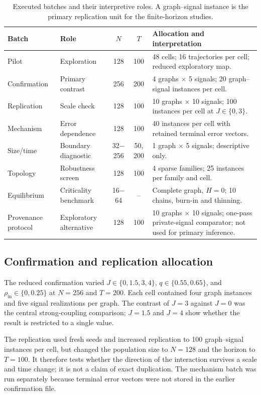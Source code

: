 \documentclass[11pt,a4paper]{article}
\begin{document}
\begin{table}[htbp]
\centering
\caption{Executed batches and their interpretive roles. A graph--signal instance is the primary replication unit for the finite-horizon studies.}
\label{tab:design}
\small
\begin{tabularx}{\textwidth}{@{}l l c c X@{}}
\toprule
Batch & Role & $N$ & $T$ & Allocation and interpretation \\
\midrule
Pilot & Exploration & 128 & 100 & 48 cells; 16 trajectories per cell; reduced exploratory map. \\
Confirmation & Primary contrast & 256 & 200 & 4 graphs $\times$ 5 signals; 20 graph--signal instances per cell. \\
Replication & Scale check & 128 & 100 & 10 graphs $\times$ 10 signals; 100 instances per cell at $J\in\{0,3\}$. \\
Mechanism & Error dependence & 128 & 100 & 40 instances per cell with retained terminal error vectors. \\
Size/time & Boundary diagnostic & 32$-$256 & 50, 200 & 1 graph $\times$ 5 signals; descriptive only. \\
Topology & Robustness screen & 128 & 100 & 4 sparse families; 25 instances per family and cell. \\
Equilibrium & Criticality benchmark & 16$-$64 & -- & Complete graph, $H=0$; 10 chains, burn-in and thinning. \\
Provenance protocol & Exploratory alternative & 128 & 100 & 10 graphs $\times$ 10 signals; one-pass private-signal comparator; not used for primary inference. \\
\bottomrule
\end{tabularx}
\end{table}

\subsection{Confirmation and replication allocation}

The reduced confirmation varied $J\in\{0,1.5,3,4\}$, $q\in\{0.55,0.65\}$, and $\rho_{\mathrm{in}}\in\{0,0.25\}$ at $N=256$ and $T=200$. Each cell contained four graph instances and five signal realizations per graph. The contrast of $J=3$ against $J=0$ was the central strong-coupling comparison; $J=1.5$ and $J=4$ show whether the result is restricted to a single value.

The replication used fresh seeds and increased replication to 100 graph--signal instances per cell, but changed the population size to $N=128$ and the horizon to $T=100$. It therefore tests whether the direction of the interaction survives a scale and time change; it is not a claim of exact duplication. The mechanism batch was run separately because terminal error vectors were not stored in the earlier confirmation file.
\end{document}
